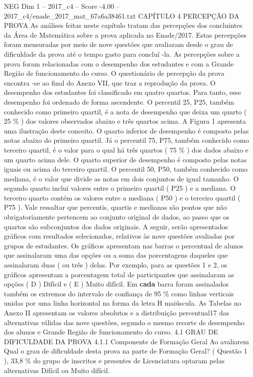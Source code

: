 \begin{textsample}{NEG Dim 1 – 2017\_c4 – Score -4.00 – 2017\_c4/enade\_2017\_mat\_67a6a38461.txt}  \label{ex:f1_neg_170}
CAPÍTULO 4 PERCEPÇÃO DA PROVA As análises feitas neste capítulo tratam das percepções dos concluintes da Área de Matemática sobre a prova aplicada no Enade/2017.
Estas percepções foram mensuradas por meio de nove questões que avaliaram desde o grau de dificuldade da prova até o tempo gasto para concluí -la.
As percepções sobre a prova foram relacionadas com o desempenho dos estudantes e com a Grande Região de funcionamento do curso.
O questionário de percepção da prova encontra -se ao final do Anexo VII, que traz a reprodução da prova.
O desempenho dos estudantes foi classificado em quatro quartos.
Para tanto, esse desempenho foi ordenado de forma ascendente.
O percentil 25, P25, também conhecido como primeiro quartil, é a nota de desempenho que deixa um quarto ( 25 \% ) dos valores observados abaixo e três quartos acima.
A Figura 1 apresenta uma ilustração deste conceito.
O quarto inferior de desempenho é composto pelas notas abaixo do primeiro quartil.
Já o percentil 75, P75, também conhecido como terceiro quartil, é o valor para o qual há três quartos ( 75 \% ) dos dados abaixo e um quarto acima dele.
O quarto superior de desempenho é composto pelas notas iguais ou acima do terceiro quartil.
O percentil 50, P50, também conhecido como mediana, é o valor que divide as notas em dois conjuntos de igual tamanho.
O segundo quarto inclui valores entre o primeiro quartil ( P25 ) e a mediana.
O terceiro quarto contém os valores entre a mediana ( P50 ) e o terceiro quartil ( P75 ).
Vale ressaltar que percentis, quartis e medianas são pontos que não obrigatoriamente pertencem ao conjunto original de dados, ao passo que os quartos são subconjuntos dos dados originais.
A seguir, serão apresentados gráficos com resultados selecionados, relativos às nove questões avaliadas por grupos de estudantes.
Os gráficos apresentam nas barras o percentual de alunos que assinalaram uma das opções ou a soma das porcentagens daqueles que assinalaram duas ( ou três ) delas.
Por exemplo, para as questões 1 e 2, os gráficos apresentam a porcentagem total de participantes que assinalaram as opções ( D ) Difícil e ( E ) Muito difícil.
Em \textbf{cada} barra foram assinalados também os extremos do intervalo de confiança de 95 \% como linhas verticais unidas por uma linha horizontal na forma da letra H maiúscula.
As Tabelas no Anexo II apresentam os valores absolutos e a distribuição percentual17 das alternativas válidas das nove questões, segundo o mesmo recorte de desempenho dos alunos e Grande Região de funcionamento do curso. 4.1 GRAU DE DIFICULDADE DA PROVA 4.1.1 Componente de Formação Geral Ao avaliarem Qual o grau de dificuldade desta prova na parte de Formação Geral? ( Questão 1 ), 33,8 \% do grupo de inscritos e presentes de Licenciatura optaram pelas alternativas Difícil ou Muito difícil.

\end{textsample}
